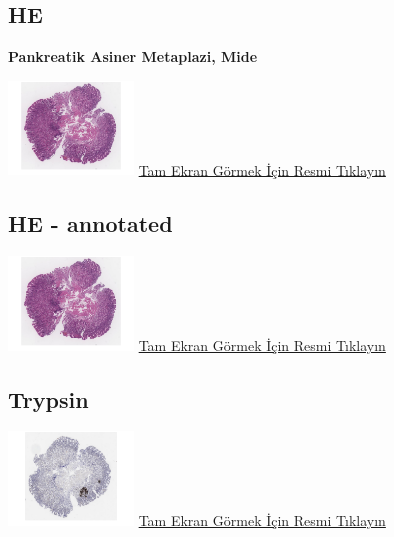 \documentclass[
  letterpaper,
  DIV=11,
  numbers=noendperiod]{scrreprt}
\begin{document}
\hypertarget{he-6}{%
\subsection{HE}\label{he-6}}

\textbf{Pankreatik Asiner Metaplazi, Mide}

\href{https://images.patolojiatlasi.com/metaplasia/HE.html}{\includegraphics[width=0.25\textwidth,height=\textheight]{./screenshots/thumbnail_metaplasia.png}}
\href{https://images.patolojiatlasi.com/metaplasia/HE.html}{Tam Ekran
Görmek İçin Resmi Tıklayın}

\hypertarget{he---annotated}{%
\subsection{HE - annotated}\label{he---annotated}}

\href{https://images.patolojiatlasi.com/metaplasia/HE_annotated.html}{\includegraphics[width=0.25\textwidth,height=\textheight]{./screenshots/thumbnail_metaplasia.png}}
\href{https://images.patolojiatlasi.com/metaplasia/HE_annotated.html}{Tam
Ekran Görmek İçin Resmi Tıklayın}

\hypertarget{trypsin}{%
\subsection{Trypsin}\label{trypsin}}

\href{https://images.patolojiatlasi.com/metaplasia/trypsin.html}{\includegraphics[width=0.25\textwidth,height=\textheight]{./screenshots/thumbnail_metaplasia-trypsin.png}}
\href{https://images.patolojiatlasi.com/metaplasia/trypsin.html}{Tam
Ekran Görmek İçin Resmi Tıklayın}
\end{document}
